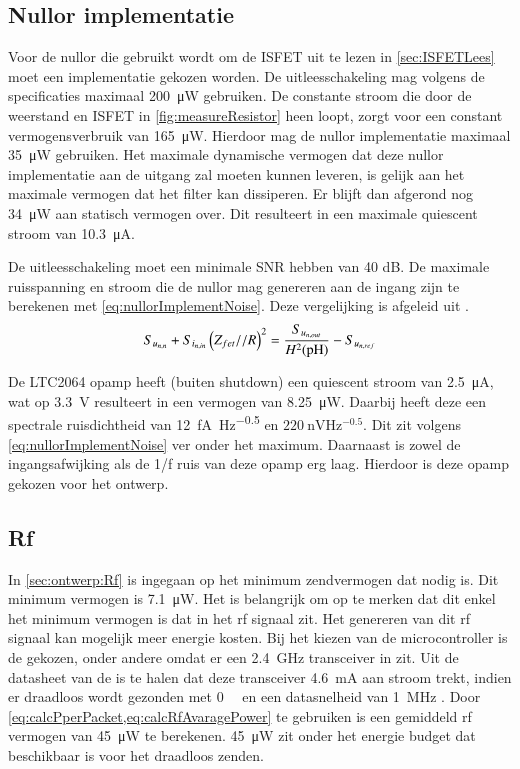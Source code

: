 \subsection{Nullor implementatie}
Voor de nullor die gebruikt wordt om de ISFET uit te lezen in \cref{sec:ISFETLees} moet een implementatie gekozen worden. De uitleesschakeling mag volgens de specificaties maximaal \qty{200}{\micro\watt}  gebruiken. De constante stroom die door de weerstand en ISFET in \cref{fig:measureResistor} heen loopt, zorgt voor een constant vermogensverbruik van \qty{165}{\micro\watt}. Hierdoor mag de nullor implementatie maximaal \qty{35}{\micro\watt} gebruiken. Het maximale dynamische vermogen dat deze nullor implementatie aan de uitgang zal moeten kunnen leveren, is gelijk aan het maximale vermogen dat het filter kan dissiperen. Er blijft dan afgerond nog \qty{34}{\micro\watt} aan statisch vermogen over. Dit resulteert in een maximale quiescent stroom van \qty{10.3}{\micro\ampere}.

De uitleesschakeling moet een minimale SNR hebben van 40 dB. De maximale ruisspanning en stroom die de nullor mag genereren aan de ingang zijn te berekenen met \cref{eq:nullorImplementNoise}. Deze vergelijking is afgeleid uit .
\begin{equation} \label{eq:nullorImplementNoise}
    S_{u_{{n,n}}} + S_{i_{{n,in}}}\left(Z_{fet} // R\right)^2 = \frac{S_{u_{{n,out}}}}{H^2(\mathrm{pH})} - S_{u_{{n,ref}}}
\end{equation}

De LTC2064 opamp heeft (buiten shutdown) een quiescent stroom van \qty{2.5}{\micro\ampere}, wat op \qty{3.3}{\volt} resulteert in een vermogen van \qty{8.25}{\micro\watt}. Daarbij heeft deze een spectrale ruisdichtheid van \qty{12}{\femto\ampere\hertz^{-0.5}} en $\qty{220}{\nano\volt\hertz^{-0.5}}$\cite{LTC2064}. Dit zit volgens \cref{eq:nullorImplementNoise} ver onder het maximum. Daarnaast is zowel de ingangsafwijking als de 1/f ruis van deze opamp erg laag. Hierdoor is deze opamp gekozen voor het ontwerp.

\subsection{Rf}
In \cref{sec:ontwerp:Rf} is ingegaan op het minimum zendvermogen dat nodig is. Dit minimum vermogen is \qty{7.1}{\micro\watt}. Het is belangrijk om op te merken dat dit enkel het minimum vermogen is dat in het rf signaal zit. Het genereren van dit rf signaal kan mogelijk meer energie kosten. Bij het kiezen van de microcontroller is de \mcu gekozen, onder andere omdat er een \qty{2.4}{\giga\hertz} transceiver in zit. Uit de datasheet van de \mcu is te halen dat deze transceiver \qty{4.6}{\milli\ampere} aan stroom trekt, indien er draadloos wordt gezonden met \qty{0}{\deci\belmilliwatt} en een datasnelheid van \qty{1}{\mega\hertz} \cite{nrf52810}. Door \cref{eq:calcPperPacket,eq:calcRfAvaragePower} te gebruiken is een gemiddeld rf vermogen van \qty{45}{\micro\watt} te berekenen. \qty{45}{\micro\watt} zit onder het energie budget dat beschikbaar is voor het draadloos zenden.

